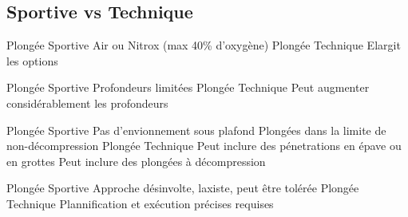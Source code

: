 \subsection{Sportive vs Technique}

\begin{frame}{\insertsubsection}
	\begin{outline}
		\1 Plongée Sportive
			\2 Air ou Nitrox (max 40\% d'oxygène)
		\1 Plongée Technique
			\2 Elargit les options 
	\end{outline}
\end{frame}

\begin{frame}{\insertsubsection}
	\begin{outline}
		\1 Plongée Sportive
			\2 Profondeurs limitées
		\1 Plongée Technique
			\2 Peut augmenter considérablement les profondeurs
	\end{outline}
\end{frame}

\begin{frame}{\insertsubsection}
	\begin{outline}
		\1 Plongée Sportive
			\2 Pas d'envionnement sous plafond
			\2 Plongées dans la limite de non-décompression
		\1 Plongée Technique
			\2 Peut inclure des pénetrations en épave ou en grottes
			\2 Peut inclure des plongées à décompression
	\end{outline}
\end{frame}

\begin{frame}{\insertsubsection}
	\begin{outline}
		\1 Plongée Sportive
			\2 Approche désinvolte, laxiste, peut être tolérée
		\1 Plongée Technique
			\2 Plannification et exécution précises requises
	\end{outline}
\end{frame}

\begin{frame}{\insertsubsection}
	\begin{center}
		\Large
	\end{center}
\end{frame}

